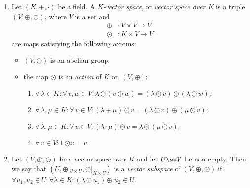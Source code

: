 \documentclass{article}
\begin{document}
\begin{enumerate}
    \item {} 
Let $(K,+,\cdot)$ be a field. A $K$\emph{-vector space}, or \emph{vector space over $K$} is a triple $(V,\oplus,\odot)$, where $V$ is a set and 
\begin{align*}
   \oplus &: V\times V \to V\\
\odot  &: K\times V \to V 
\end{align*}
are maps satisfying the following axioms:
\begin{itemize}
\item $(V,\oplus)$ is an abelian group;
\item the map $\odot$ is an \emph{action} of $K$ on $(V,\oplus)$:
\begin{enumerate}
   \item $\forall \, \lambda \in K : \forall \, v,w \in V : \lambda\odot(v\oplus w)=(\lambda\odot v)\oplus (\lambda\odot w)$;
\item $\forall \, \lambda,\mu \in K : \forall \, v \in V : (\lambda+\mu)\odot v= (\lambda \odot v) \oplus (\mu \odot v)$;
\item $\forall \, \lambda,\mu \in K : \forall \, v \in V : (\lambda\cdot\mu)\odot v= \lambda \odot (\mu \odot v)$;
\item $\forall \, v \in V : 1\odot v = v$.
\end{enumerate}
\end{itemize}
\item {}
Let $(V,\oplus,\odot)$ be a vector space over $K$ and let $U\se V$ be non-empty. Then we say that $(U,\oplus|_{U\times U},\odot|_{K\times U})$ is a \emph{vector subspace} of $(V,\oplus,\odot)$ if $\forall u_1,u_2\in U:\forall \lambda \in K: (\lambda\odot u_1)\oplus u_2\in U$. 



\end{enumerate}
\end{document}
